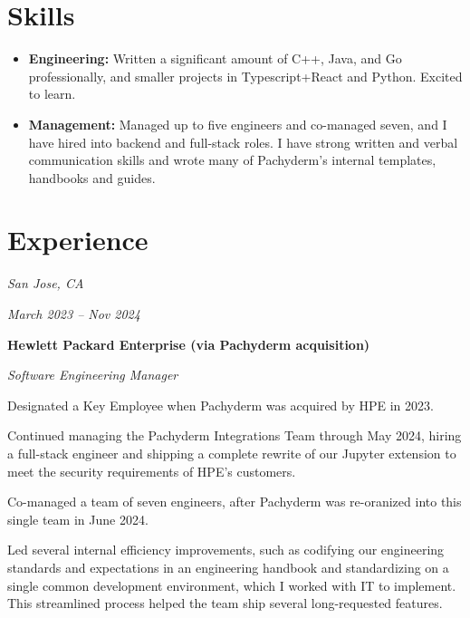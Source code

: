 \documentclass[10pt, letterpaper]{article}
\begin{document}
\section{Skills}

\begin{onecolentry}
  \begin{itemize}[label={},itemindent=-0.4cm-10pt]
        \item\textbf{Engineering:} Written a significant amount of C++, Java, and Go professionally, and smaller projects in Typescript+React and Python. Excited to learn.

        \item\textbf{Management:} Managed up to five engineers and co-managed seven, and I have hired into backend and full-stack roles. I have strong written and verbal communication skills and wrote many of Pachyderm's internal templates, handbooks and guides.
    \end{itemize}
\end{onecolentry}

\section{Experience}

\begin{twocolentry}{
    \textit{San Jose, CA}

    \textit{March 2023 – Nov 2024}
}
    \textbf{Hewlett Packard Enterprise (via Pachyderm acquisition)}

    \textit{Software Engineering Manager}
\end{twocolentry}

\vspace{0.1 cm}

\begin{onecolentry}
    \begin{highlights}
        \item Designated a Key Employee when Pachyderm was acquired by HPE in 2023.
        \item Continued managing the Pachyderm Integrations Team through May 2024, hiring a full-stack engineer and shipping a complete rewrite of our Jupyter extension to meet the security requirements of HPE's customers.
        \item Co-managed a team of seven engineers, after Pachyderm was re-oranized into this single team in June 2024.
        \item Led several internal efficiency improvements, such as codifying our engineering standards and expectations in an engineering handbook and standardizing on a single common development environment, which I worked with IT to implement. This streamlined process helped the team ship several long-requested features.
    \end{highlights}
\end{onecolentry}
\end{document}
